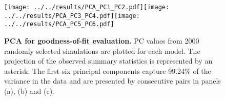 \documentclass[a4paper]{article}
\begin{document}
\begin{figure}[h]
\begin{center}
\texttt{[image: ../../results/PCA\_PC1\_PC2.pdf]}\texttt{[image: ../../results/PCA\_PC3\_PC4.pdf]}\texttt{[image: ../../results/PCA\_PC5\_PC6.pdf]}
\end{center}
\caption{\textbf{PCA for goodness-of-fit evaluation.} PC values from 2000 randomly selected simulations are plotted for each model. The projection of the observed summary statistics is represented by an asterisk. The first six principal components capture 99.24\% of the variance in the data and are presented by consecutive pairs in panels (a), (b) and (c).}
\label{fig:PCA_all}
\end{figure}




\end{document}
